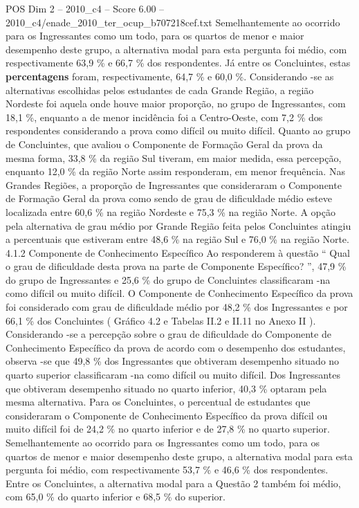 \begin{textsample}{POS Dim 2 – 2010\_c4 – Score 6.00 – 2010\_c4/enade\_2010\_ter\_ocup\_b707218cef.txt}
Semelhantemente ao ocorrido para os Ingressantes como um todo, para os quartos de menor e maior desempenho deste grupo, a alternativa modal para esta pergunta foi médio, com respectivamente 63,9 \% e 66,7 \% dos respondentes.
Já entre os Concluintes, estas \textbf{percentagens} foram, respectivamente, 64,7 \% e 60,0 \%.
Considerando -se as alternativas escolhidas pelos estudantes de cada Grande Região, a região Nordeste foi aquela onde houve maior proporção, no grupo de Ingressantes, com 18,1 \%, enquanto a de menor incidência foi a Centro-Oeste, com 7,2 \% dos respondentes considerando a prova como difícil ou muito difícil.
Quanto ao grupo de Concluintes, que avaliou o Componente de Formação Geral da prova da mesma forma, 33,8 \% da região Sul tiveram, em maior medida, essa percepção, enquanto 12,0 \% da região Norte assim responderam, em menor frequência.
Nas Grandes Regiões, a proporção de Ingressantes que consideraram o Componente de Formação Geral da prova como sendo de grau de dificuldade médio esteve localizada entre 60,6 \% na região Nordeste e 75,3 \% na região Norte.
A opção pela alternativa de grau médio por Grande Região feita pelos Concluintes atingiu a percentuais que estiveram entre 48,6 \% na região Sul e 76,0 \% na região Norte. 4.1.2 Componente de Conhecimento Específico Ao responderem à questão “ Qual o grau de dificuldade desta prova na parte de Componente Específico? ”, 47,9 \% do grupo de Ingressantes e 25,6 \% do grupo de Concluintes classificaram -na como difícil ou muito difícil.
O Componente de Conhecimento Específico da prova foi considerado com grau de dificuldade médio por 48,2 \% dos Ingressantes e por 66,1 \% dos Concluintes ( Gráfico 4.2 e Tabelas II.2 e II.11 no Anexo II ).
Considerando -se a percepção sobre o grau de dificuldade do Componente de Conhecimento Específico da prova de acordo com o desempenho dos estudantes, observa -se que 49,8 \% dos Ingressantes que obtiveram desempenho situado no quarto superior classificaram -na como difícil ou muito difícil.
Dos Ingressantes que obtiveram desempenho situado no quarto inferior, 40,3 \% optaram pela mesma alternativa.
Para os Concluintes, o percentual de estudantes que consideraram o Componente de Conhecimento Específico da prova difícil ou muito difícil foi de 24,2 \% no quarto inferior e de 27,8 \% no quarto superior.
Semelhantemente ao ocorrido para os Ingressantes como um todo, para os quartos de menor e maior desempenho deste grupo, a alternativa modal para esta pergunta foi médio, com respectivamente 53,7 \% e 46,6 \% dos respondentes.
Entre os Concluintes, a alternativa modal para a Questão 2 também foi médio, com 65,0 \% do quarto inferior e 68,5 \% do superior.

\end{textsample}
